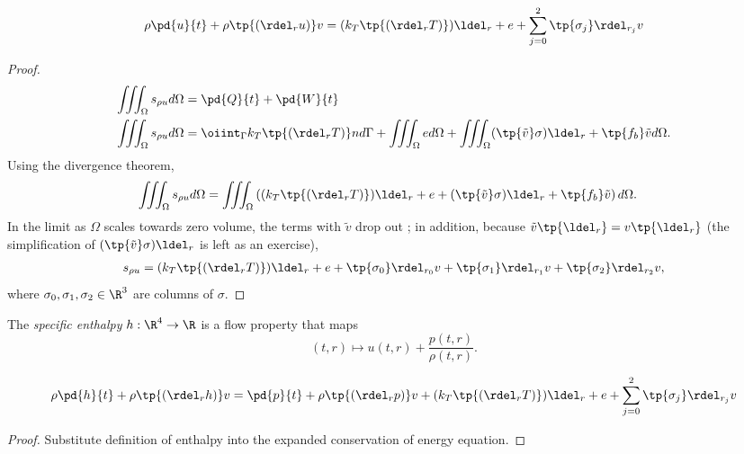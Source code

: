 \begin{thm}
\begin{equation}
    \rho \pd{u}{t} + \rho \tp{(\rdel_r u )} v  = (k_T \tp{\left( \rdel_r T\right)} ) \ldel_r + e + \sum_{j=0}^2 \tp{\sigma_j} \rdel_{r_j} v
\end{equation}
\end{thm}
\begin{proof}
\begin{align}
    \iiint_\Omega s_{\rho u} d\Omega &= \pd{Q}{t} + \pd{W}{t} \\
    \iiint_\Omega s_{\rho u} d\Omega &= 
        \oiint_\Gamma k_T \tp{\left( \rdel_r T\right)} n d\Gamma + \iiint_\Omega e d\Omega +
        \iiint_\Omega (\tp{\tilde{v}} \sigma) \ldel_r + \tp{f_b} \tilde{v} d\Omega.
\end{align}
Using the divergence theorem,
\begin{align}
    \iiint_\Omega s_{\rho u} d\Omega &= 
        \iiint_\Omega \left( (k_T \tp{\left( \rdel_r T\right)} ) \ldel_r + e +
        (\tp{\tilde{v}} \sigma) \ldel_r + \tp{f_b} \tilde{v} \right) d\Omega.
\end{align}
In the limit as $\Omega$ scales towards zero volume, the terms with $\tilde{v}$ drop out
; in addition, because $\tilde{v}\tp{\ldel_r} = v\tp{\ldel_r}$ (the simplification of $(\tp{\tilde{v}}\sigma)\ldel_r$
is left as an exercise),
\begin{align}
    s_{\rho u} = (k_T \tp{\left( \rdel_r T\right)} ) \ldel_r + e +
        \tp{\sigma_0} \rdel_{r_0} v + \tp{\sigma_1} \rdel_{r_1} v + \tp{\sigma_2} \rdel_{r_2} v,
\end{align}
where $\sigma_0, \sigma_1, \sigma_2 \in \R^3$ are columns of $\sigma$.

\end{proof}


\begin{df}
The \emph{specific enthalpy} $h:\R^4\to \R$ is a flow property that maps
    \begin{equation}
        (t,r) \mapsto u(t,r) + \frac{p(t,r)}{\rho(t,r)}.
    \end{equation}
\end{df}

\begin{thm}
\begin{equation}
    \rho \pd{h}{t} + \rho \tp{(\rdel_r h )} v  = 
    \pd{p}{t} + \rho \tp{(\rdel_r p )} v +
    (k_T \tp{\left( \rdel_r T\right)} ) \ldel_r + e + \sum_{j=0}^2 \tp{\sigma_j} \rdel_{r_j} v
\end{equation}
\end{thm}
\begin{proof}
Substitute definition of enthalpy into the expanded conservation of energy equation.
\end{proof}

